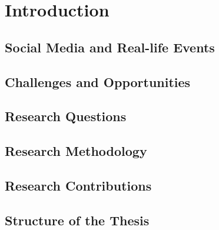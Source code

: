 
\chapter{Introduction} %

\label{introduction} %


\section{Social Media and Real-life Events}

\section{Challenges and Opportunities}

\section{Research Questions}

\section{Research Methodology}

\section{Research Contributions}

\section{Structure of the Thesis}

